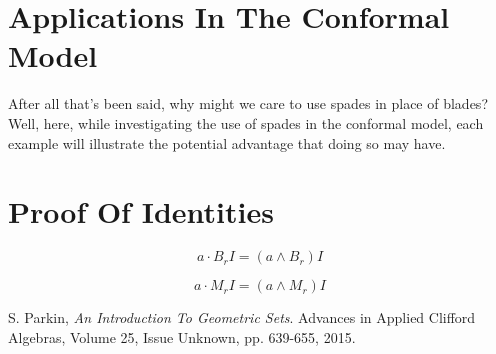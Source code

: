 \documentclass{birkjour}
\theoremstyle{definition}
\theoremstyle{remark}
\numberwithin{equation}{section}
\begin{document}



\section{Applications In The Conformal Model}

After all that's been said, why might we care to use spades in place of blades?  Well, here, while investigating the use of
spades in the conformal model, each example will illustrate the potential advantage that doing so may have.

\section{Proof Of Identities}



\begin{equation}
a\cdot B_rI = (a\wedge B_r)I
\end{equation}

\begin{equation}
a\cdot M_rI = (a\wedge M_r)I
\end{equation}

\begin{thebibliography}{9}

S. Parkin,
\emph{An Introduction To Geometric Sets}.
Advances in Applied Clifford Algebras, Volume 25, Issue Unknown, pp. 639-655, 2015.

\end{thebibliography}
\end{document}
